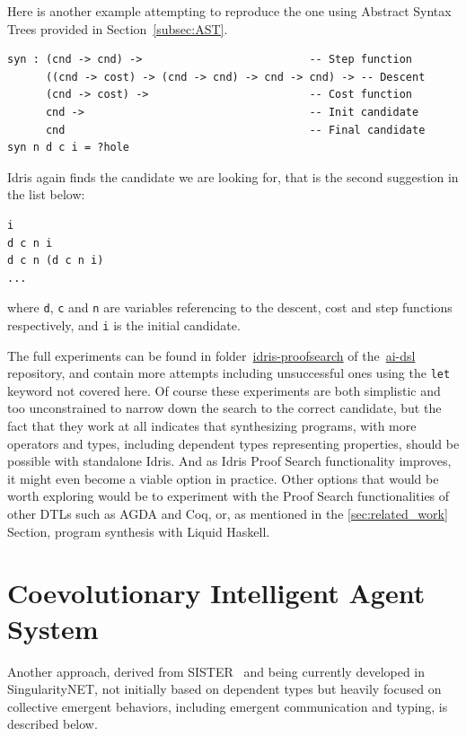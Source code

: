 \documentclass[]{report}
\begin{document}
Here is another example attempting to reproduce the one using Abstract
Syntax Trees provided in Section~\ref{subsec:AST}.
\begin{verbatim}
syn : (cnd -> cnd) ->                          -- Step function
      ((cnd -> cost) -> (cnd -> cnd) -> cnd -> cnd) -> -- Descent
      (cnd -> cost) ->                         -- Cost function
      cnd ->                                   -- Init candidate
      cnd                                      -- Final candidate
syn n d c i = ?hole
\end{verbatim}
Idris again finds the candidate we are looking for, that is the second
suggestion in the list below:
\begin{verbatim}
i
d c n i
d c n (d c n i)
...
\end{verbatim}
where \texttt{d}, \texttt{c} and \texttt{n} are variables referencing
to the descent, cost and step functions respectively, and \texttt{i}
is the initial candidate.

The full experiments can be found in
folder~\href{https://github.com/singnet/ai-dsl/blob/master/experimental/program-synthesis/idris-proofsearch}{idris-proofsearch}
of the~\href{https://github.com/singnet/ai-dsl}{ai-dsl} repository,
and contain more attempts including unsuccessful ones using the
\texttt{let} keyword not covered here.  Of course these experiments
are both simplistic and too unconstrained to narrow down the search to
the correct candidate, but the fact that they work at all indicates
that synthesizing programs, with more operators and types, including
dependent types representing properties, should be possible with
standalone Idris.  And as Idris Proof Search functionality improves,
it might even become a viable option in practice.  Other options that
would be worth exploring would be to experiment with the Proof Search
functionalities of other DTLs such as AGDA and Coq, or, as mentioned
in the \ref{sec:related_work} Section, program synthesis with Liquid
Haskell.

\section{Coevolutionary Intelligent Agent System}

Another approach, derived from SISTER~\cite{Duong2004} and being
currently developed in SingularityNET, not initially based on
dependent types but heavily focused on collective emergent behaviors,
including emergent communication and typing, is described below.
\end{document}
